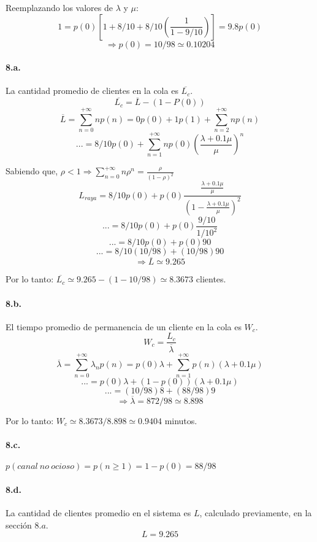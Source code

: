 \documentclass{article}
\begin{document}
   Reemplazando los valores de $\lambda$ y $\mu$:
      $$1 = p(0) [1 + 8/10 + 8/10 (\frac{1}{1 - 9/10})] = 9.8 p(0)$$
      $$\Rightarrow p(0) = 10 / 98 \simeq 0.10204$$

   \paragraph{8.a.} La cantidad promedio de clientes en la cola es $ \overline{L_{c}}$.
      $$ \overline{L_{c}} = \overline{L} - (1 - P(0))$$
      $$\overline{L} = \sum_{n=0}^{+\infty} n p(n) = 0 p(0) + 1 p(1) + \sum_{n=2}^{+\infty} n p(n)$$
      $$... = 8/10 p(0) + \sum_{n=1}^{+\infty} n p(0) (\frac{\lambda + 0.1 \mu}{\mu})^n$$

      Sabiendo que, $\rho < 1 \Rightarrow \sum_{n=0}^{+\infty} n \rho^n = \frac{\rho}{(1- \rho)^2}$
      $$L_{raya} = 8/10 p(0) + p(0) \frac{\frac{\lambda + 0.1 \mu}{\mu}}{(1 - \frac{\lambda + 0.1 \mu}{\mu})^2}$$
      $$... = 8/10 p(0) + p(0) \frac{9/10}{1/10^2}$$
      $$... = 8/10 p(0) + p(0) 90$$
      $$... = 8/10 (10/98) + (10/98) 90$$
      $$\Rightarrow \overline{L} \simeq 9.265$$

      Por lo tanto: $\overline{L_{c}} \simeq 9.265 - (1-10/98) \simeq 8.3673$ clientes.


   \paragraph{8.b.} El tiempo promedio de permanencia de un cliente en la cola es $W_c$.
      $$W_c = \frac{L_c}{\overline{\lambda}}$$
      $$\overline{\lambda} = \sum_{n=0}^{+\infty} \lambda_n p(n) = p(0) \lambda + \sum_{n=1}^{+\infty} p(n) (\lambda + 0.1 \mu) $$
      $$... = p(0) \lambda + (1 - p(0)) (\lambda + 0.1 \mu) $$
      $$... = (10/98) 8 + (88/98) 9$$
      $$\Rightarrow \overline{\lambda} = 872/98 \simeq 8.898$$

      Por lo tanto: $W_c \simeq 8.3673 / 8.898 \simeq 0.9404$ minutos.


   \paragraph{8.c.} $p(canal\:no\:ocioso) = p(n \ge 1) = 1 - p(0) = 88/98$

   \paragraph{8.d.} La cantidad de clientes promedio en el sistema es $L$, calculado previamente, en la sección $8.a$.
      $$L = 9.265$$
\end{document}
